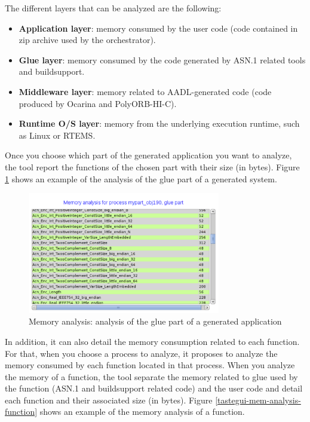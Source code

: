 \documentclass[11pt]{book}
\begin{document}
   The different layers that can be analyzed are the following:
   \begin{itemize}
      \item
         \textbf{Application layer}: memory consumed by the user code (code
         contained in zip archive used by the orchestrator).
      \item
         \textbf{Glue layer}: memory consumed by the code generated by ASN.1
         related tools and buildsupport.
      \item
         \textbf{Middleware layer}: memory related to AADL-generated code (code
         produced by Ocarina and PolyORB-HI-C).
      \item
         \textbf{Runtime O/S layer}: memory from the underlying execution
         runtime, such as Linux or RTEMS.
   \end{itemize}

   Once you choose which part of the generated application you want to analyze,
   the tool report the functions of the chosen part with their size (in bytes).
   Figure \ref{tastegui-mem-analysis-part} shows an example of the analysis of
   the glue part of a generated system.


\begin{figure}[!h]
\centering
\includegraphics[width=0.75\textwidth]{imgs/memory-analysis4}
\caption{Memory analysis: analysis of the glue part of a generated application}
\label{tastegui-mem-analysis-part}
\end{figure}


   In addition, it can also detail the memory consumption related to each
   function. For that, when you choose a process to analyze, it proposes to
   analyze the memory consumed by each function located in that process. When
   you analyze the memory of a function, the tool separate the memory related to
   glue used by the function (ASN.1 and buildsupport related code) and the user
   code and detail each function and their associated size (in bytes).
   Figure \ref{tastegui-mem-analysis-function} shows an example of the
   memory analysis of a function.
\end{document}
